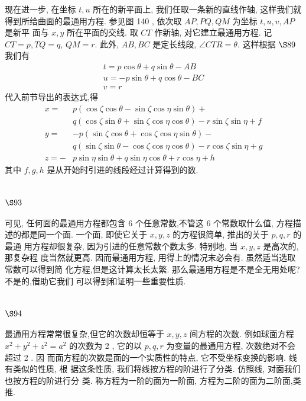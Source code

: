 现在进一步, 在坐标 $t, u$ 所在的新平面上, 我们任取一条新的直线作轴, 这样我们就 得到所给曲面的最通用方程. 参见图 140 , 依次取 $A P, P Q, Q M$ 为坐标 $t, u, v, A P$ 是新平 面与 $x, y$ 所在平面的交线. 取 $C T$ 作新轴, 对它建立最通用方程. 记 $C T=p, T Q=q$, $Q M=r$. 此外, $A B, B C$ 是定长线段, $\angle C T R=\theta$. 这样根据 $\S 89$ 我们有
\[
\begin{gathered}
t=p \cos \theta+q \sin \theta-A B \\
u=-p \sin \theta+q \cos \theta-B C \\
v=r
\end{gathered}
\]
代入前节导出的表达式,得
\[
\begin{aligned}
x= & p(\cos \zeta \cos \theta-\sin \zeta \cos \eta \sin \theta)+ \\
& q(\cos \zeta \sin \theta+\sin \zeta \cos \eta \cos \theta)-r \sin \zeta \sin \eta+f \\
y= & -p(\sin \zeta \cos \theta+\cos \zeta \cos \eta \sin \theta)- \\
& q(\sin \zeta \sin \theta-\cos \zeta \cos \eta \cos \theta)-r \cos \zeta \sin \eta+g \\
z=- & p \sin \eta \sin \theta+q \sin \eta \cos \theta+r \cos \eta+h
\end{aligned}
\]
其中 $f, g, h$ 是从开始时引进的线段经过计算得到的数.

\section{$\S 93$}

可见, 任何面的最通用方程都包含 6 个任意常数,不管这 6 个常数取什么值, 方程描 述的都是同一个面. 一个面, 即使它关于 $x, y, z$ 的方程很简单, 推出的关于 $p, q, r$ 的最通 用方程却很复杂, 因为引进的任意常数个数太多. 特别地, 当 $x, y, z$ 是高次的, 那复杂程 度当然就更高. 因而最通用方程, 用得上的情况末必会有. 虽然适当选取常数可以得到简 化方程,但是这计算太长太繁. 那么最通用方程是不是全无用处呢? 不是的,借助它我们 可以得到和证明一些重要性质.

\section{$\S 94$}

最通用方程常常很复杂,但它的次数却恒等于 $x, y, z$ 间方程的次数. 例如球面方程 $x^{2}+y^{2}+z^{2}=a^{2}$ 的次数为 2 , 它的以 $p, q, r$ 为变量的最通用方程, 次数绝对不会超过 2 . 因 而面方程的次数是面的一个实质性的特点, 它不受坐标变换的影响. 线有类似的性质, 根 据这条性质, 我们将线按方程的阶进行了分类. 仿照线, 对面我们也按方程的阶进行分 类. 称方程为一阶的面为一阶面, 方程为二阶的面为二阶面,类推.


